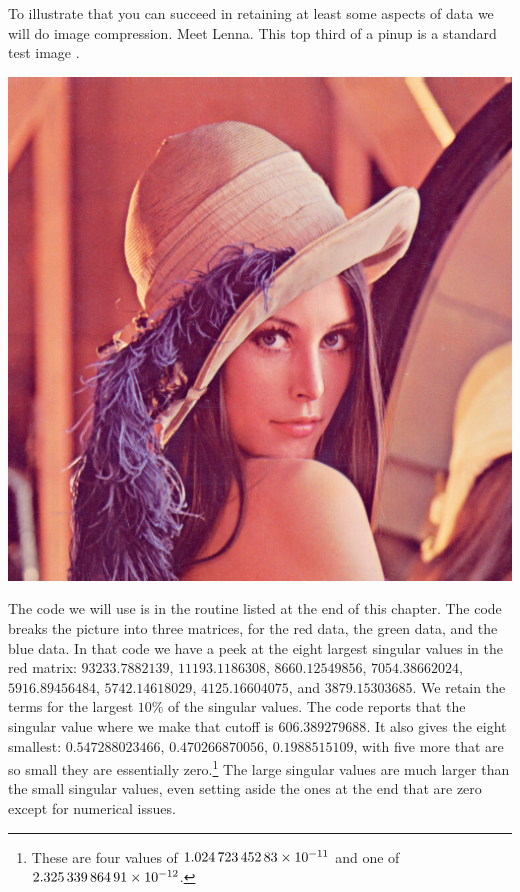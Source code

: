 To illustrate that you can succeed in retaining at least some aspects of data
we will do image compression.
Meet Lenna.
This top third of a pinup is a standard test image
\cite{wiki:Lenna}.
\begin{center}
  \includegraphics[width=.95\textwidth]{Lenna.png} %
\end{center}

The code we will use is in the  routine 
listed at the end of this chapter.
The code breaks the picture into three matrices, for the red data, the 
green data, and the blue data.
In that code we have a peek at the eight largest singular
values in the red matrix:
  $93233.7882139$, 
  $11193.1186308$, 
  $8660.12549856$, 
  $7054.38662024$, 
  $5916.89456484$, 
  $5742.14618029$, 
  $4125.16604075$, and
  $3879.15303685$.
We retain the terms for the largest $10\%$ of the singular values. 
The code reports that
the singular value where we make that cutoff is $606.389279688$.
It also gives the eight smallest:
  $0.547288023466$, 
  $0.470266870056$, 
  $0.1988515109$, 
with five more that are so small they are essentially 
zero.\footnote{These are four values of 
$1.024\,723\,452\,83\protect\times 10^{-11}$
and one of $2.325\,339\,864\,91\protect\times 10^{-12}$.}
The large singular values are much larger than the small singular values,
even setting aside the ones at the end
that are zero except for numerical issues.

